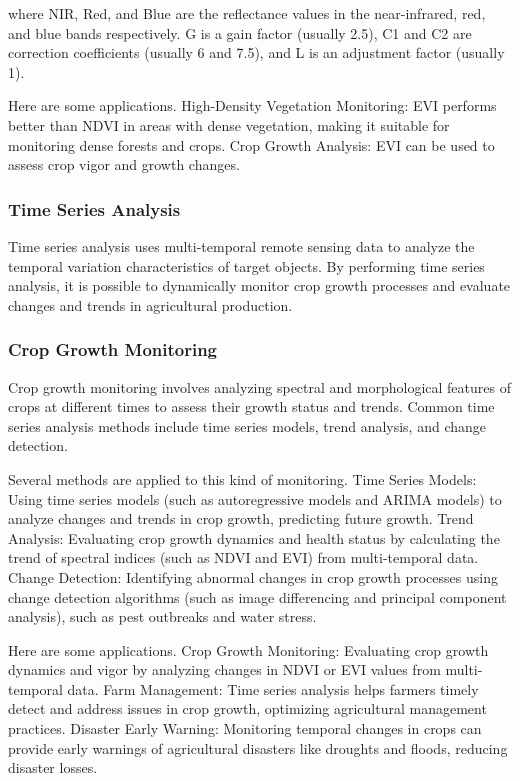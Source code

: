 where NIR, Red, and Blue are the reflectance values in the near-infrared, red, and blue bands respectively. G is a gain factor (usually 2.5), C1 and C2 are correction coefficients (usually 6 and 7.5), and L is an adjustment factor (usually 1)\cite{khanalRemoteSensingAgriculture2020}.

Here are some applications.
High-Density Vegetation Monitoring: EVI performs better than NDVI in areas with dense vegetation, making it suitable for monitoring dense forests and crops.
Crop Growth Analysis: EVI can be used to assess crop vigor and growth changes.

\subsubsection{Time Series Analysis}

Time series analysis uses multi-temporal remote sensing data to analyze the temporal variation characteristics of target objects. By performing time series analysis, it is possible to dynamically monitor crop growth processes and evaluate changes and trends in agricultural production.

\subsubsection{Crop Growth Monitoring}

Crop growth monitoring involves analyzing spectral and morphological features of crops at different times to assess their growth status and trends. Common time series analysis methods include time series models, trend analysis, and change detection.

Several methods are applied to this kind of monitoring.
Time Series Models: Using time series models (such as autoregressive models and ARIMA models) to analyze changes and trends in crop growth, predicting future growth.
Trend Analysis: Evaluating crop growth dynamics and health status by calculating the trend of spectral indices (such as NDVI and EVI) from multi-temporal data.
Change Detection: Identifying abnormal changes in crop growth processes using change detection algorithms (such as image differencing and principal component analysis), such as pest outbreaks and water stress.

Here are some applications.
Crop Growth Monitoring: Evaluating crop growth dynamics and vigor by analyzing changes in NDVI or EVI values from multi-temporal data.
Farm Management: Time series analysis helps farmers timely detect and address issues in crop growth, optimizing agricultural management practices.
Disaster Early Warning: Monitoring temporal changes in crops can provide early warnings of agricultural disasters like droughts and floods, reducing disaster losses.
